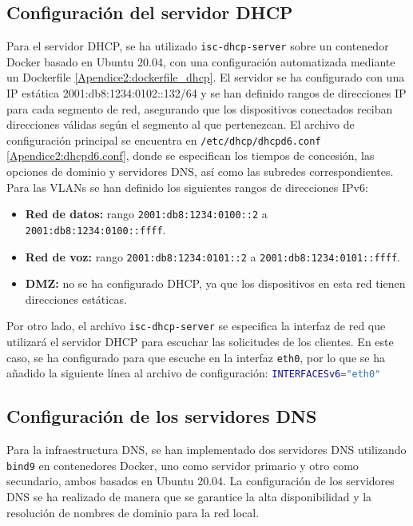 \subsection{Configuración del servidor DHCP}
Para el servidor DHCP, se ha utilizado \texttt{isc-dhcp-server} sobre un contenedor Docker basado en Ubuntu 20.04, con una configuración automatizada mediante un Dockerfile \ref{Apendice2:dockerfile_dhcp}. El servidor se ha configurado con una IP estática 2001:db8:1234:0102::132/64 y se han definido rangos de direcciones IP para cada segmento de red, asegurando que los dispositivos conectados reciban direcciones válidas según el segmento al que pertenezcan. El archivo de configuración principal se encuentra en \texttt{/etc/dhcp/dhcpd6.conf} \ref{Apendice2:dhcpd6.conf}, donde se especifican los tiempos de concesión, las opciones de dominio y servidores DNS, así como las subredes correspondientes. Para las VLANs se han definido los siguientes rangos de direcciones IPv6:
\begin{itemize}
	\item \textbf{Red de datos:} rango \texttt{2001:db8:1234:0100::2} a \texttt{2001:db8:1234:0100::ffff}.
	\item \textbf{Red de voz:} rango \texttt{2001:db8:1234:0101::2} a \texttt{2001:db8:1234:0101::ffff}.
	\item \textbf{DMZ:} no se ha configurado DHCP, ya que los dispositivos en esta red tienen direcciones estáticas.
\end{itemize}

Por otro lado, el archivo \texttt{isc-dhcp-server} se especifica la interfaz de red que utilizará el servidor DHCP
para escuchar las solicitudes de los clientes. En este caso, se ha configurado para que escuche en la interfaz \texttt{eth0}, por lo que se ha añadido la siguiente línea al archivo de configuración: \lstinline[language=bash]|INTERFACESv6="eth0"|

\subsection{Configuración de los servidores DNS}
Para la infraestructura DNS, se han implementado dos servidores DNS utilizando \texttt{bind9} en contenedores Docker, uno como servidor primario y otro como secundario, ambos basados en Ubuntu 20.04. La configuración de los servidores DNS se ha realizado de manera que se garantice la alta disponibilidad y la resolución de nombres de dominio para la red local.

